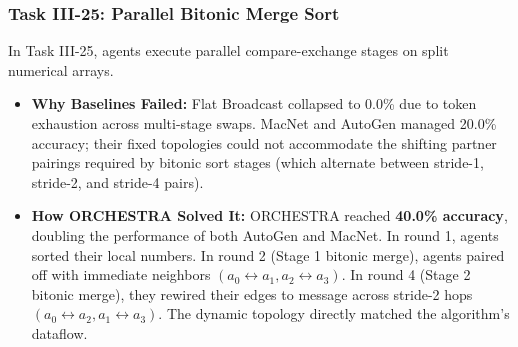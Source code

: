 \documentclass{ieeeaccess}
\begin{document}
\subsubsection{Task III-25: Parallel Bitonic Merge Sort}
In Task III-25, agents execute parallel compare-exchange stages on split numerical arrays.
\begin{itemize}
    \item \textbf{Why Baselines Failed:} Flat Broadcast collapsed to 0.0\% due to token exhaustion across multi-stage swaps. MacNet and AutoGen managed 20.0\% accuracy; their fixed topologies could not accommodate the shifting partner pairings required by bitonic sort stages (which alternate between stride-1, stride-2, and stride-4 pairs).
    \item \textbf{How ORCHESTRA Solved It:} ORCHESTRA reached \textbf{40.0\% accuracy}, doubling the performance of both AutoGen and MacNet. In round 1, agents sorted their local numbers. In round 2 (Stage 1 bitonic merge), agents paired off with immediate neighbors $(a_0 \leftrightarrow a_1, a_2 \leftrightarrow a_3)$. In round 4 (Stage 2 bitonic merge), they rewired their edges to message across stride-2 hops $(a_0 \leftrightarrow a_2, a_1 \leftrightarrow a_3)$. The dynamic topology directly matched the algorithm's dataflow.
\end{itemize}
\end{document}
